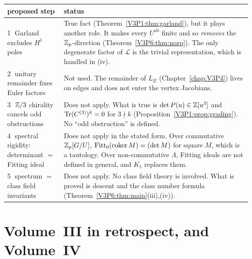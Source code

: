 \begin{center}
\small
\begin{tabular}{p{}p{}}
\toprule
proposed step & status\\
\midrule
\textcircled{1} Garland excludes $H^{1}$ poles & True fact (Theorem~\ref{V3P1:thm:garland}), but it plays another role. It makes every $U^{\mathrm{ab}}$ finite and so \emph{removes} the $\mathbb{Z}_p$-direction (Theorem~\ref{V3P6:thm:nozp}). The only degenerate factor of $\mathcal L$ is the trivial representation, which is handled in (iv).\\
\textcircled{2} unitary remainder fixes Euler factors & Not used. The remainder of $L_E$ (Chapter~\ref{chap:V3P4}) lives on edges and does not enter the vertex Jacobians.\\
\textcircled{3} $\mathbb{Z}/3$ chirality cancels odd obstructions & Does not apply. What is true is $\det P(u)\in\mathbb{Z}[u^{3}]$ and $\operatorname{Tr}(C^{(3)})^{k}=0$ for $3\nmid k$ (Proposition~\ref{V3P1:prop:grading}). No ``odd obstruction'' is defined.\\
\textcircled{4} spectral rigidity: determinant $=$ Fitting ideal & Does not apply in the stated form. Over commutative $\mathbb{Z}_p[G/U]$, $\mathrm{Fitt}_0(\operatorname{coker} M)=(\det M)$ for square $M$, which is a tautology. Over non-commutative $\Lambda$, Fitting ideals are not defined in general, and $K_1$ replaces them.\\
\textcircled{5} spectrum $=$ class field invariants & Does not apply. No class field theory is involved. What is proved is descent and the class number formula (Theorem~\ref{V3P6:thm:main}(iii),(iv)).\\
\bottomrule
\end{tabular}
\end{center}

\section{Volume~III in retrospect, and Volume~IV}\label{V3P6:sec:retro}

